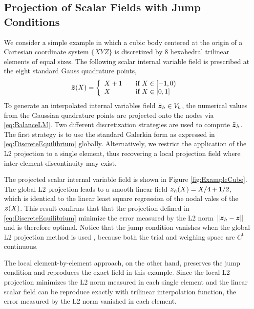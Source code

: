 \documentclass[12pt]{article}
\begin{document}
\subsection{Projection of Scalar Fields with Jump Conditions}
We consider a simple example in which a cubic body centered at the
origin of a Cartesian coordinate system $\{XYZ\}$ is discretized by 8
hexahedral trilinear elements of equal sizes. The following scalar
internal variable field is prescribed at the eight standard Gauss
quadrature points,
\begin{equation}
\bar{{\boldsymbol{z}}}(X) = \left\{
  \begin{array}{l l}
    X + 1 & \quad \text{if $X \in [-1, 0)$ }\\
     X & \quad \text{if $X \in [0, 1]$ }\\
  \end{array} \right.
  \label{eq:PrescribedScalar}
\end{equation}
To generate an interpolated internal variables field $\bar{{\boldsymbol{z}}}_{h}
\in V_{h}$, the numerical values from the Gaussian quadrature points
are projected onto the nodes via \eqref{eq:BalanceLM}. Two different
discretization strategies are used to compute $\bar{{\boldsymbol{z}}}_{h}$. The
first strategy is to use the standard Galerkin form as expressed in
\eqref{eq:DiscreteEquilibrium} globally. Alternatively, we restrict the 
application of the L2 projection to a single element, thus recovering 
a local projection field where inter-element discontinuity may exist. 

The projected scalar internal variable field is shown in Figure
\ref{fig:ExampleCube}. The global L2 projection  leads
to a smooth linear field ${\boldsymbol{z}}_{h}(X) = X/4 + 1/2$, which is identical
to the linear least square regression of the nodal vales of the
${\boldsymbol{z}}(X)$. This result confirms that that the projection defined in
\eqref{eq:DiscreteEquilibrium} minimize the error measured by the L2
norm $||{\boldsymbol{z}}_{h} - {\boldsymbol{z}} ||$ and is therefore optimal. Notice that the
jump condition vanishes when the global L2 projection method is used , because both
the trial and weighing space are $C^{0}$ continuous.
 
The local element-by-element approach, on the other hand, preserves the jump
condition and reproduces the exact field in this example. Since the local
L2 projection minimizes the L2 norm measured in each single element and the 
linear scalar field can be reproduce exactly with trilinear interpolation function, 
the error measured by the L2 norm vanished in each element. 
\end{document}
